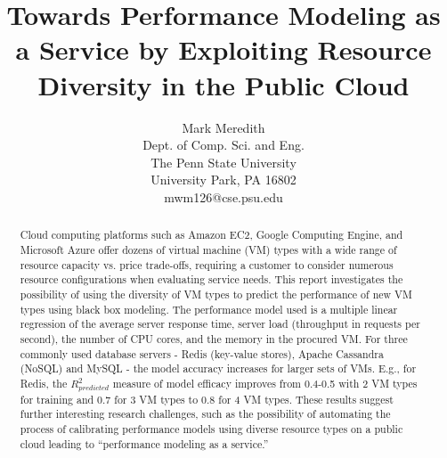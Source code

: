 \documentclass[a4paper,11pt]{article}
\begin{document}
\title{Towards Performance Modeling as a Service by Exploiting Resource Diversity in the Public Cloud}

\author{
Mark Meredith\\
       Dept. of Comp. Sci. and Eng.\\
       The Penn State University\\
       University Park, PA 16802\\
       mwm126@cse.psu.edu
}
\maketitle

\begin{abstract}

Cloud computing platforms such as Amazon EC2, Google Computing Engine, and Microsoft Azure
offer dozens of virtual machine (VM) types with a wide range of resource capacity vs. price trade-offs, requiring a customer to consider numerous resource configurations when evaluating service needs. This report investigates the possibility of using the diversity of VM types to predict the performance of new VM types using black box modeling. The performance model used is a multiple linear regression of the average server response time, server load (throughput in requests per second), the number of CPU cores, and the memory in the procured VM. For three commonly used database servers - Redis (key-value stores), Apache Cassandra (NoSQL) and MySQL -  the model accuracy increases for larger sets of VMs.  E.g., for Redis, the $R^2_{predicted}$ measure of model efficacy improves from 0.4-0.5 with 2 VM types for training and 0.7 for 3 VM types to 0.8 for 4 VM types.  These results suggest further interesting research challenges, such as the possibility of automating the process of calibrating performance models using diverse resource types on a public cloud leading to ``performance modeling as a service.''

\end{abstract}










\end{document}

